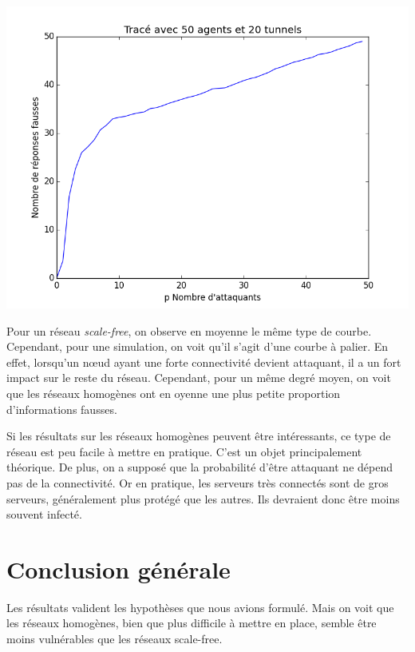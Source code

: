 \documentclass[11pt,a4paper]{article}
\begin{document}
\includegraphics[scale=0.3]{../resultats/atkaleat/atkaleat-50-20-1.png} 
	
	Pour un réseau \emph{scale-free}, on observe en moyenne le même type de courbe. Cependant, pour une simulation, on voit qu'il s'agit d'une courbe à palier. En effet, lorsqu'un nœud ayant une forte connectivité devient attaquant, il a un fort impact sur le reste du réseau.
	Cependant, pour un même degré moyen, on voit que les réseaux homogènes ont en oyenne une plus petite proportion d'informations fausses. 


	Si les résultats sur les réseaux homogènes peuvent être intéressants, ce type de réseau est peu facile à mettre en pratique. C'est un objet principalement théorique. De plus, on a supposé que la probabilité d'être attaquant ne dépend pas de la connectivité. Or en pratique, les serveurs très connectés sont de gros serveurs, généralement plus protégé que les autres. Ils devraient donc être moins souvent infecté.


\section{Conclusion générale} %

	Les résultats valident les hypothèses que nous avions formulé. Mais on voit que les réseaux homogènes, bien que plus difficile à mettre en place, semble être moins vulnérables que les réseaux scale-free. 
\end{document}
